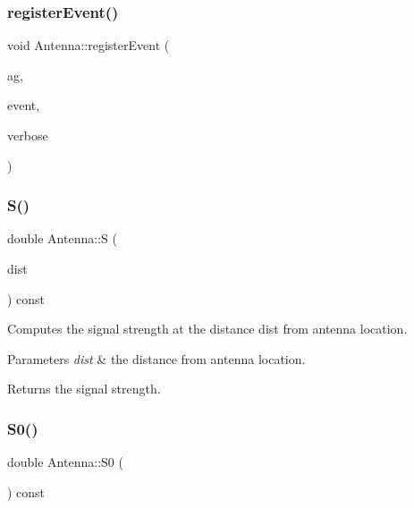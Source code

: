 \subsubsection{\texorpdfstring{registerEvent()}{registerEvent()}}
{\footnotesize\ttfamily void Antenna\+::register\+Event (\begin{DoxyParamCaption}\item[{\mbox{\hyperlink{class_holdable_agent}{Holdable\+Agent}} $\ast$}]{ag,  }\item[{const \mbox{\hyperlink{_event_type_8h_a2628ea8d12e8b2563c32f05dc7fff6fa}{Event\+Type}}}]{event,  }\item[{const bool}]{verbose }\end{DoxyParamCaption})\hspace{0.3cm}{\ttfamily [private]}}

\mbox{\label{class_antenna_a5715c4100035c58d63b7c9a0195748fe}} 
\subsubsection{\texorpdfstring{S()}{S()}}
{\footnotesize\ttfamily double Antenna\+::S (\begin{DoxyParamCaption}\item[{double}]{dist }\end{DoxyParamCaption}) const}

Computes the signal strength at the distance dist from antenna location. 
\begin{DoxyParams}{Parameters}
{\em dist} & the distance from antenna location. \\
\hline
\end{DoxyParams}
\begin{DoxyReturn}{Returns}
the signal strength. 
\end{DoxyReturn}
\mbox{\label{class_antenna_a033246c50bec80123860154a949620c7}} 
\subsubsection{\texorpdfstring{S0()}{S0()}}
{\footnotesize\ttfamily double Antenna\+::\+S0 (\begin{DoxyParamCaption}{ }\end{DoxyParamCaption}) const\hspace{0.3cm}{\ttfamily [private]}}

